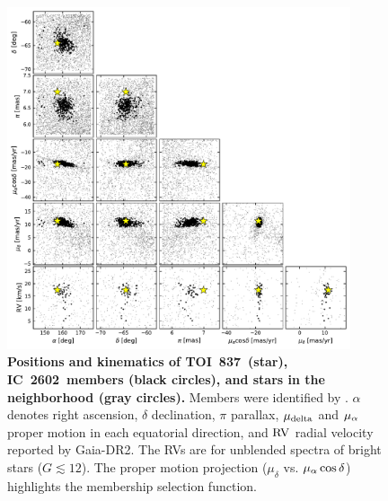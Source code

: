 \documentclass[12pt,twocolumn,tighten]{aastex62}
\newcommand{\tn}{TOI~837} %
\newcommand{\cn}{IC~2602} %
\begin{document}
\begin{figure}[t!]
	\begin{center}
		\leavevmode
		\includegraphics[width=0.9\textwidth]{f8.pdf}
	\end{center}
	\vspace{-0.7cm}
	\caption{ 
  {\bf Positions and kinematics of \tn\ (star), \cn\ members (black
  circles), and stars in the neighborhood (gray circles).} Members
  were identified by \citet{cantatgaudin_gaia_2018}.  $\alpha$ denotes
  right ascension, $\delta$ declination, $\pi$ parallax, $\mu_{\rm
  delta}$ and $\mu_{\rm \alpha}$ proper motion in each equatorial
  direction, and ${\rm RV}$ radial velocity reported by Gaia-DR2.  The
  RVs are for unblended spectra of bright stars ($G\lesssim 12$).  The
  proper motion projection ($\mu_{\delta}$ vs{.} $\mu_{\rm
  \alpha}\cos\delta$) highlights the membership selection function.
  \label{fig:full_kinematics}
	}
\end{figure}
\end{document}
